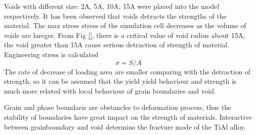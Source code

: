 \documentclass[journal,article,submit,moreauthors,pdftex,10pt,a4paper]{Definitions/mdpi}
\begin{document}
	
	
	
	
Voids with different size: 2A, 5A, 10A, 15A were placed into the model respectively. It has been observed that  voids detracts the strengths of the material. The max stress stress of the simulation cell decreases as the volume of voids are lareger. From Fig \ref{}, there is a critical value of void radius about 15A, the void greater than 15A cause serious detraction of strength of material. 
Engineering stress is calculated
	$$ \sigma = S/A$$
The rate of decrease of loading area are smaller comparing with the detraction of strength, so it can be assumed that the yield yield behaviour and strength is much more related with local behaviour of grain boundaries and void.
	
Grain and phase boundaris are obstancles to deformation process, thus the stability of boundaries have great impact on the strength of materials. Interactive between grainboundary and void determins the fracture mode of the TiAl alloy.
	
\end{document}
